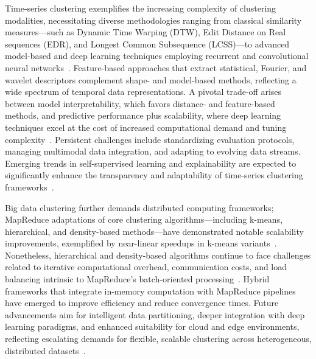 \documentclass[sigconf]{acmart}
\begin{document}
Time-series clustering exemplifies the increasing complexity of clustering modalities, necessitating diverse methodologies ranging from classical similarity measures—such as Dynamic Time Warping (DTW), Edit Distance on Real sequences (EDR), and Longest Common Subsequence (LCSS)—to advanced model-based and deep learning techniques employing recurrent and convolutional neural networks~\cite{ref23}. Feature-based approaches that extract statistical, Fourier, and wavelet descriptors complement shape- and model-based methods, reflecting a wide spectrum of temporal data representations. A pivotal trade-off arises between model interpretability, which favors distance- and feature-based methods, and predictive performance plus scalability, where deep learning techniques excel at the cost of increased computational demand and tuning complexity~\cite{ref23}. Persistent challenges include standardizing evaluation protocols, managing multimodal data integration, and adapting to evolving data streams. Emerging trends in self-supervised learning and explainability are expected to significantly enhance the transparency and adaptability of time-series clustering frameworks~\cite{ref23}.

Big data clustering further demands distributed computing frameworks; MapReduce adaptations of core clustering algorithms—including k-means, hierarchical, and density-based methods—have demonstrated notable scalability improvements, exemplified by near-linear speedups in k-means variants~\cite{ref16}. Nonetheless, hierarchical and density-based algorithms continue to face challenges related to iterative computational overhead, communication costs, and load balancing intrinsic to MapReduce’s batch-oriented processing~\cite{ref16}. Hybrid frameworks that integrate in-memory computation with MapReduce pipelines have emerged to improve efficiency and reduce convergence times. Future advancements aim for intelligent data partitioning, deeper integration with deep learning paradigms, and enhanced suitability for cloud and edge environments, reflecting escalating demands for flexible, scalable clustering across heterogeneous, distributed datasets~\cite{ref16}.
\end{document}
